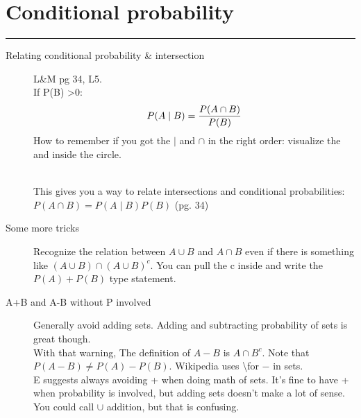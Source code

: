 \section{Conditional probability}
\smallskip \hrule height 2pt \smallskip

\begin{description}
\item[Relating conditional probability \& intersection]     L\&M pg 34, L5. \hfill \\
If P(B) \textgreater 0:
	\begin{align*}
		P(A \mid B) = \frac{ P(A \cap B) }{ P(B) }   \hfill \\
	\end{align*}
How to remember if you got the $\mid$ and $\cap$ in the right order: visualize the and inside the circle.

\hfill \\
This gives you a way to relate intersections and conditional probabilities:
$P(A \cap B) = P(A \mid B)P(B)$  (pg. 34)

\item[Some more tricks]
	Recognize the relation between $A \cup B$  and $A \cap B$ even if there is something like $(A \cup B) \cap (A \cup B)^c$.  You can pull the c inside and write the $P(A) + P(B)$ type statement.
	
\item[A+B and A-B without P involved]
Generally avoid adding sets.  Adding and subtracting probability of sets is great though. \hfill \\
With that warning, The definition of $A-B$ is $A \cap B^c$.  Note that $P(A-B) \neq P(A) - P(B)$.  Wikipedia uses \textbackslash  for $-$ in sets. \hfill \\ 
E suggests always avoiding + when doing math of sets.  It's fine to have + when probability is involved, but adding sets doesn't make a lot of sense.  You could call $\cup$ addition, but that is confusing.  
\end{description}


